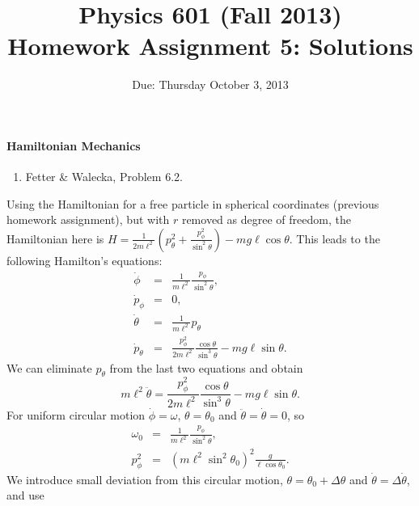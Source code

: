 \documentclass[letterpaper,11pt]{article}
\title{Physics 601 (Fall 2013) \\ Homework Assignment 5: Solutions}
\date{Due: Thursday October 3, 2013}
\begin{document}
\maketitle

\paragraph*{Hamiltonian Mechanics}
\begin{enumerate}
 \item Fetter \& Walecka, Problem 6.2.
\end{enumerate}

Using the Hamiltonian for a free particle in spherical coordinates (previous homework assignment), but with $r$ removed as degree of freedom, the Hamiltonian here is $H = \frac{1}{2 m \ell^2} \left( p_\theta^2 + \frac{p_\phi^2}{\sin^2\theta} \right) - m g \ell \cos\theta$.  This leads to the following Hamilton's equations:
\begin{eqnarray*}
 \dot{\phi} & =  & \frac{1}{m\ell^2} \frac{p_\phi}{\sin^2\theta}, \\
 \dot{p}_\phi & = & 0, \\
 \dot{\theta} & = & \frac{1}{m\ell^2} p_\theta \\
 \dot{p}_\theta & = & \frac{p_\phi^2}{2m\ell^2} \frac{\cos\theta}{\sin^3\theta} - mg\ell\sin\theta.
\end{eqnarray*}
We can eliminate $p_\theta$ from the last two equations and obtain
\begin{equation*}
 m\ell^2\ddot{\theta} = \frac{p_\phi^2}{2m\ell^2} \frac{\cos\theta}{\sin^3\theta} - mg\ell\sin\theta.
\end{equation*}
For uniform circular motion $\dot\phi = \omega$, $\theta = \theta_0$ and $\ddot\theta = \dot\theta = 0$, so
\begin{eqnarray*}
 \omega_0 & = & \frac{1}{m\ell^2} \frac{p_\phi}{\sin^2\theta}, \\
 p_\phi^2 & = & \left(m\ell^2\sin^2\theta_0\right)^2 \frac{g}{\ell\cos\theta_0}.
\end{eqnarray*}
We introduce small deviation from this circular motion, $\theta = \theta_0 + \Delta\theta$ and $\dot\theta = \Delta\dot\theta$, and use
\end{document}
